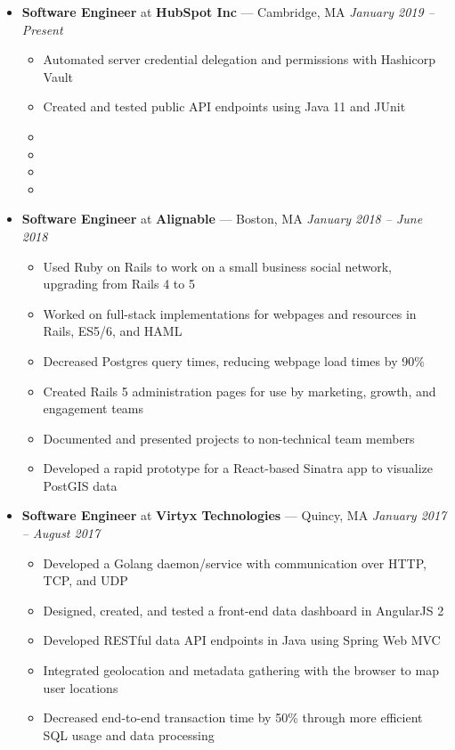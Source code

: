 \documentclass{article}
\begin{document}
\begin{itemize}[label={},leftmargin=*]
  \item \textbf{Software Engineer} at \textbf{HubSpot Inc} --- Cambridge, MA \hfill {\em January 2019 -- Present}
  \begin{itemize}[label={$\bullet$}]
    \item Automated server credential delegation and permissions with Hashicorp Vault
    \item Created and tested public API endpoints using Java 11 and JUnit
    \item 
    \item 
    \item 
    \item 
  \end{itemize}

  \item \textbf{Software Engineer} at \textbf{Alignable} --- Boston, MA \hfill {\em January 2018 -- June 2018}
  \begin{itemize}[label={$\bullet$}]
    \item Used Ruby on Rails to work on a small business social network, upgrading from Rails 4 to 5
    \item Worked on full-stack implementations for webpages and resources in Rails, ES5/6, and HAML
    \item Decreased Postgres query times, reducing webpage load times by 90\%
    \item Created Rails 5 administration pages for use by marketing, growth, and engagement teams
    \item Documented and presented projects to non-technical team members
    \item Developed a rapid prototype for a React-based Sinatra app to visualize PostGIS data
  \end{itemize}

  \item \textbf{Software Engineer} at \textbf{Virtyx Technologies} --- Quincy, MA \hfill {\em January 2017 -- August 2017}
  \begin{itemize}[label={$\bullet$}]
    \item Developed a Golang daemon/service with communication over HTTP, TCP, and UDP
    \item Designed, created, and tested a front-end data dashboard in AngularJS 2
    \item Developed RESTful data API endpoints in Java using Spring Web MVC
    \item Integrated geolocation and metadata gathering with the browser to map user locations
    \item Decreased end-to-end transaction time by 50\% through more efficient SQL usage and data processing
  \end{itemize}
\end{itemize}
\end{document}

